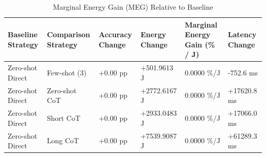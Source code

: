 \begin{table}
\caption{Marginal Energy Gain (MEG) Relative to Baseline}
\label{tab:marginal_energy_gain}
\begin{tabular}{llllll}
\toprule
Baseline Strategy & Comparison Strategy & Accuracy Change & Energy Change & Marginal Energy Gain (\% / J) & Latency Change \\
\midrule
Zero-shot Direct & Few-shot (3) & +0.00 pp & +501.9613 J & 0.0000 \%/J & -752.6 ms \\
Zero-shot Direct & Zero-shot CoT & +0.00 pp & +2772.6167 J & 0.0000 \%/J & +17620.8 ms \\
Zero-shot Direct & Short CoT & +0.00 pp & +2933.0483 J & 0.0000 \%/J & +17066.0 ms \\
Zero-shot Direct & Long CoT & +0.00 pp & +7539.9087 J & 0.0000 \%/J & +61289.3 ms \\
\bottomrule
\end{tabular}
\end{table}
